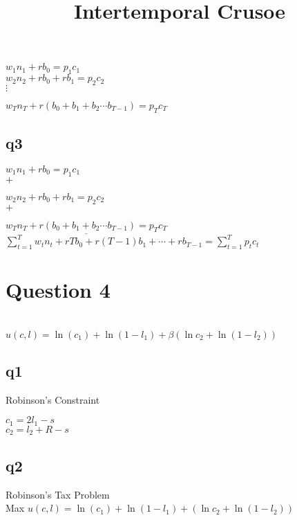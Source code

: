 \documentclass[11pt]{article}
\begin{document}
$w_{1}n_{1}+rb_{0}=p_{1}c_{1}$\\


$w_{2}n_{2}+rb_{0}+rb_{1}=p_{2}c_{2}$\\



$\vdots$

$w_{T}n_{T}+r(b_{0}+b_{1}+b_{2}\cdots b_{T-1}) =p_{T}c_{T}$\\


\subsection{q3}

$w_{1}n_{1}+rb_{0}=p_{1}c_{1}$\\

$+$

$w_{2}n_{2}+rb_{0}+rb_{1}=p_{2}c_{2}$\\

$+$

$ \underline {w_{T}n_{T}+r(b_{0}+b_{1}+b_{2}\cdots b_{T-1}) =p_{T}c_{T} }$\\


$\sum_{t=1}^{T}w_{t}n_{t}+rTb_{0}+r(T-1)b_{1}+\cdots+rb_{T-1}=\sum_{t=1}^{T}p_{t}c_{t}$

\section{Question 4 }

\title{Intertemporal Crusoe}\\


$u(c,l)=\ln(c_{1})+\ln(1-l_{1})+\beta \left(\ln c_{2}+\ln(1-l_{2})\right)$\\


\subsection{q1}
Robinson's Constraint

$c_{1}=2l_{1}-s$\\

$c_{2}=l_{2}+R-s$\\

\subsection{q2}
Robinson's Tax Problem\\

Max $u(c,l)=\ln(c_{1})+\ln(1-l_{1})+ \left(\ln c_{2}+\ln(1-l_{2})\right)$\\
\end{document}
